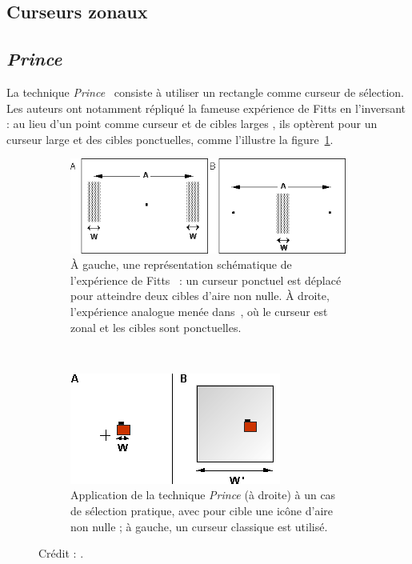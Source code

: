 \begin{appendices}
\section{Curseurs zonaux}
	\subsection{\emph{Prince}}
	\label{sub:prince}
	La technique \emph{Prince}~\cite{kabbash1995prince} consiste à utiliser un rectangle comme curseur de sélection. Les auteurs ont notamment répliqué la fameuse expérience de Fitts en l'inversant : au lieu d'un point comme curseur et de cibles \og larges \fg{} , ils optèrent pour un curseur large et des cibles ponctuelles, comme l'illustre la figure~\ref{fig:princeCursor}.
	
	\begin{figure}[htbp]
		\begin{subfigure}[t]{0.56\textwidth}
			\centering
			\includegraphics[width=\textwidth]{figures/ch2/princeCursor}
			\caption{À gauche, une représentation schématique de l'expérience de Fitts~\cite{fitts1954information} : un curseur ponctuel est déplacé pour atteindre deux cibles d'aire non nulle. À droite, l'expérience analogue menée dans~\cite{kabbash1995prince}, où le curseur est zonal et les cibles sont ponctuelles.}
			\label{fig:princeCursor}
		\end{subfigure}
		~
		\begin{subfigure}[t]{0.42\textwidth}
			\centering
			\includegraphics[width=\textwidth]{figures/ch2/princeSelection}
			\caption{Application de la technique \emph{Prince} (à droite) à un cas de sélection pratique, avec pour cible une icône d'aire non nulle ; à gauche, un curseur classique est utilisé.}
			\label{fig:princeSelection}
		\end{subfigure}
		\caption[\emph{Prince}, curseur et sélection]{Crédit : \cite{kabbash1995prince}.}
		\label{fig:princeCursorSelection}
	\end{figure}


\end{appendices}
